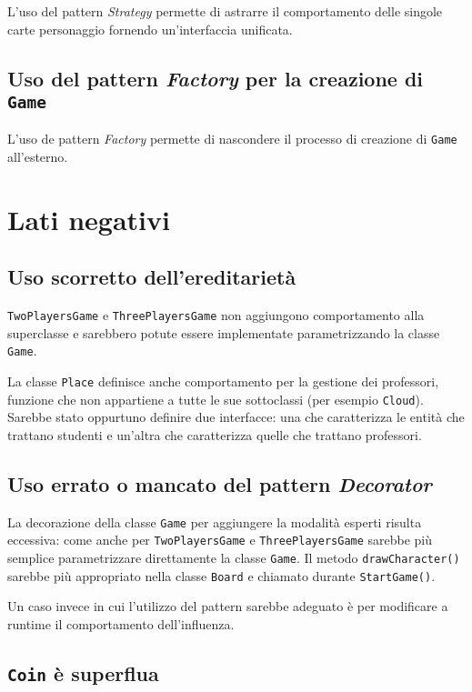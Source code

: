 \documentclass[12pt]{article}
\begin{document}
    L'uso del pattern \textit{Strategy} permette di astrarre il comportamento
    delle singole carte personaggio fornendo un'interfaccia unificata.

    \subsection{Uso del pattern \textit{Factory} per la creazione di \texttt{Game}}

    L'uso de pattern \textit{Factory} permette di nascondere il processo di
    creazione di \texttt{Game} all'esterno.


    \section{Lati negativi}

    \subsection{Uso scorretto dell'ereditarietà}\label{ereditarieta}

    \texttt{TwoPlayersGame} e \texttt{ThreePlayersGame} non aggiungono
    comportamento alla superclasse e sarebbero potute essere implementate
    parametrizzando la classe \texttt{Game}.

    La classe \texttt{Place} definisce anche comportamento per la gestione dei
    professori, funzione che non appartiene a tutte le sue sottoclassi (per
    esempio \texttt{Cloud}). Sarebbe stato oppurtuno definire due interfacce:
    una che caratterizza le entità che trattano studenti e un'altra che
    caratterizza quelle che trattano professori.

    \subsection{Uso errato o mancato del pattern \textit{Decorator}}
    La decorazione della classe \texttt{Game} per aggiungere la modalità esperti
    risulta eccessiva: come anche per \texttt{TwoPlayersGame} e
    \texttt{ThreePlayersGame} sarebbe più semplice parametrizzare direttamente
    la classe \texttt{Game}. Il metodo \texttt{drawCharacter()} sarebbe più
    appropriato nella classe \texttt{Board} e chiamato durante
    \texttt{StartGame()}.

    Un caso invece in cui l'utilizzo del pattern sarebbe adeguato è per
    modificare a runtime il comportamento dell'influenza.

    \subsection{\texttt{Coin} è superflua}
\end{document}
